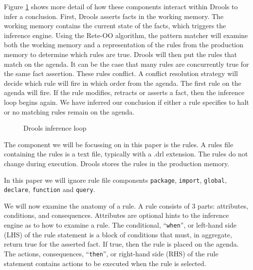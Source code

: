 Figure \ref{fig:Drools_inference_loop} shows more detail of how these components interact within Drools to infer a conclusion.
First, Drools asserts facts in the working memory.
The working memory contains the current state of the facts, which triggers the inference engine.
Using the Rete-OO algorithm, the pattern matcher will examine both the working memory and a representation of the rules from the production memory to determine which rules are true.
Drools will then put the rules that match on the agenda.
It can be the case that many rules are concurrently true for the same fact assertion.
These rules conflict.
A conflict resolution strategy will decide which rule will fire in which order from the agenda.
The first rule on the agenda will fire.
If the rule modifies, retracts or asserts a fact, then the inference loop begins again.
We have inferred our conclusion if either a rule specifies to halt or no matching rules remain on the agenda.

\begin{figure}[h]
    \centering
    \caption{Drools inference loop}
    \label{fig:Drools_inference_loop}
\end{figure}

The component we will be focussing on in this paper is the rules.
A rules file containing the rules is a text file, typically with a .drl extension.
The rules do not change during execution.
Drools stores the rules in the production memory.

In this paper we will ignore rule file components \texttt{package}, \texttt{import}, \texttt{global}, \texttt{declare}, \texttt{function} and \texttt{query}.

We will now examine the anatomy of a rule.
A rule consists of 3 parts: attributes, conditions, and consequences.
Attributes are optional hints to the inference engine as to how to examine a rule.
The conditional, ``\texttt{when}'', or left-hand side (LHS) of the rule statement is a block of conditions that must, in aggregate, return true for the asserted fact. If true, then the rule is placed on the agenda.
The actions, consequences, ``\texttt{then}'', or right-hand side (RHS) of the rule statement contains actions to be executed when the rule is selected.

